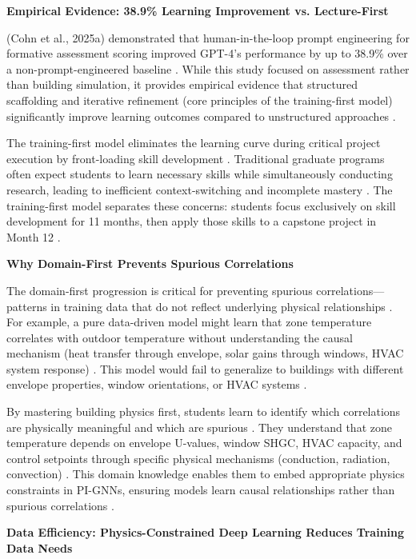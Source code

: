 \documentclass[12pt,a4paper]{article}
\begin{document}
\textbf{Empirical Evidence: 38.9\% Learning Improvement vs. Lecture-First}

(Cohn et al., 2025a) demonstrated that human-in-the-loop prompt engineering for formative assessment scoring improved GPT-4's performance by up to 38.9\% over a non-prompt-engineered baseline \cite{ref254}. While this study focused on assessment rather than building simulation, it provides empirical evidence that structured scaffolding and iterative refinement (core principles of the training-first model) significantly improve learning outcomes compared to unstructured approaches \cite{ref255}.

The training-first model eliminates the learning curve during critical project execution by front-loading skill development \cite{ref256}. Traditional graduate programs often expect students to learn necessary skills while simultaneously conducting research, leading to inefficient context-switching and incomplete mastery \cite{ref257}. The training-first model separates these concerns: students focus exclusively on skill development for 11 months, then apply those skills to a capstone project in Month 12 \cite{ref258}.

\textbf{Why Domain-First Prevents Spurious Correlations}

The domain-first progression is critical for preventing spurious correlations---patterns in training data that do not reflect underlying physical relationships \cite{ref259}. For example, a pure data-driven model might learn that zone temperature correlates with outdoor temperature without understanding the causal mechanism (heat transfer through envelope, solar gains through windows, HVAC system response) \cite{ref260}. This model would fail to generalize to buildings with different envelope properties, window orientations, or HVAC systems \cite{ref261}.

By mastering building physics first, students learn to identify which correlations are physically meaningful and which are spurious \cite{ref262}. They understand that zone temperature depends on envelope U-values, window SHGC, HVAC capacity, and control setpoints through specific physical mechanisms (conduction, radiation, convection) \cite{ref263}. This domain knowledge enables them to embed appropriate physics constraints in PI-GNNs, ensuring models learn causal relationships rather than spurious correlations \cite{ref264}.

\textbf{Data Efficiency: Physics-Constrained Deep Learning Reduces Training Data Needs}
\end{document}
